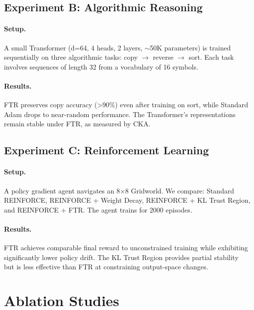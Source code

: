 \documentclass{article}
\begin{document}
\subsection{Experiment B: Algorithmic Reasoning}

\paragraph{Setup.} A small Transformer (d=64, 4 heads, 2 layers, $\sim$50K parameters) is trained sequentially on three algorithmic tasks: copy $\to$ reverse $\to$ sort. Each task involves sequences of length 32 from a vocabulary of 16 symbols.

\paragraph{Results.} FTR preserves copy accuracy (>90\%) even after training on sort, while Standard Adam drops to near-random performance. The Transformer's representations remain stable under FTR, as measured by CKA.

\subsection{Experiment C: Reinforcement Learning}

\paragraph{Setup.} A policy gradient agent navigates an 8$\times$8 Gridworld. We compare: Standard REINFORCE, REINFORCE + Weight Decay, REINFORCE + KL Trust Region, and REINFORCE + FTR. The agent trains for 2000 episodes.

\paragraph{Results.} FTR achieves comparable final reward to unconstrained training while exhibiting significantly lower policy drift. The KL Trust Region provides partial stability but is less effective than FTR at constraining output-space changes.


\section{Ablation Studies}
\end{document}
